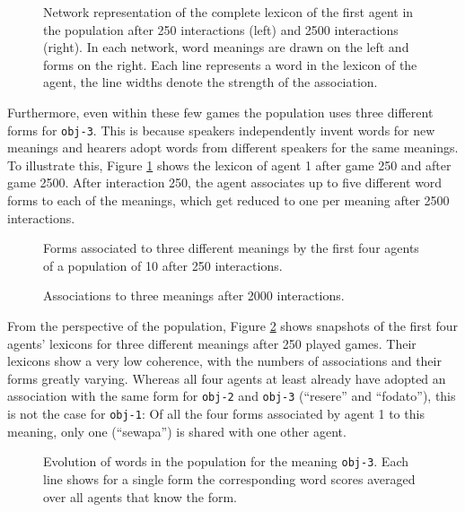 \begin{figure}[t]
\begin{tabular}{@{}cp{0.20cm}c@{}}
  \end{tabular}
  \caption{Network representation of the complete lexicon of the first
    agent in the population after 250 interactions (left) and 2500
    interactions (right). In each network, word meanings are drawn on
    the left and forms on the right. Each line represents a word in
    the lexicon of the agent, the line widths denote the strength of
    the association.}
  \label{f:ng-lexicon}
\end{figure}


Furthermore, even within these few games the population uses three
different forms for \texttt{obj-3}. This is because speakers
independently invent words for new meanings and hearers adopt words
from different speakers for the same meanings. To illustrate this,
Figure \ref{f:ng-lexicon} shows the lexicon of agent 1 after game 250
and after game 2500. After interaction 250, the agent associates up to
five different word forms to each of the meanings, which get reduced
to one per meaning after 2500 interactions. 

\startfiguregroup

\begin{figure}[t]
  
  \caption{Forms associated to three different meanings by the first
    four agents of a population of 10 after 250 interactions.}
  \label{f:ng-lexicon-250}
\end{figure}

\begin{figure}[t]
  
  \caption{Associations to three meanings after 2000 interactions.}
  \label{f:ng-lexicon-2000}
\end{figure}

\stopfiguregroup

From the perspective of the population, Figure \ref{f:ng-lexicon-250}
shows snapshots of the first four agents' lexicons for three different
meanings after 250 played games. Their lexicons show a very low
coherence, with the numbers of associations and their forms greatly
varying. Whereas all four agents at least already have adopted an
association with the same form for \texttt{obj-2} and \texttt{obj-3}
(``resere'' and ``fodato''), this is not the case for \texttt{obj-1}:
Of all the four forms associated by agent 1 to this meaning, only one
(``sewapa'') is shared with one other agent.

\begin{figure}[t]
  \caption{Evolution of words in the population for the meaning
    \texttt{obj-3}. Each line shows for a single form the
    corresponding word scores averaged over all agents that know the
    form.}
  \label{f:ng-word-form-scores-obj-3}
\end{figure}


